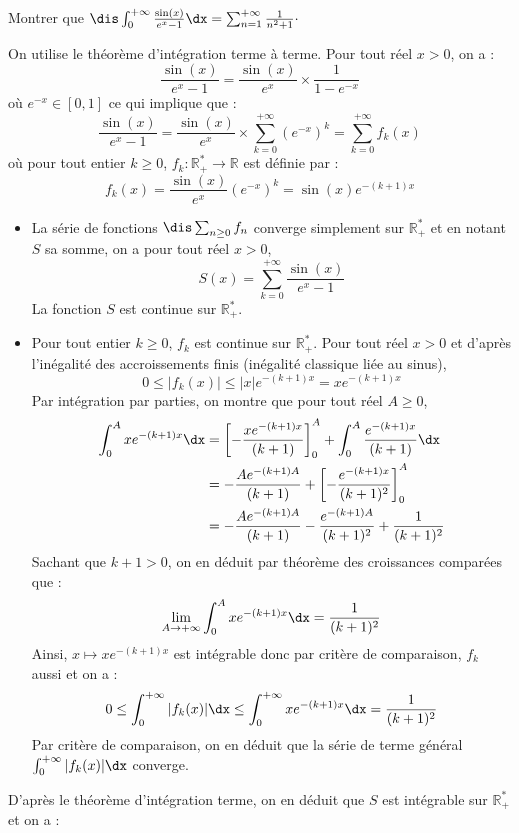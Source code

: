 \documentclass[a4paper,10pt]{report}
\begin{document}
\begin{Exa} Montrer que $\dis \int_{0}^{+ \infty} \frac{\sin(x)}{e^x-1} \dx = \sum_{n=1}^{+ \infty} \frac{1}{n^2+1}\cdot$
\end{Exa}

\corr On utilise le théorème d'intégration terme à terme. Pour tout réel $x>0$, on a :
$$ \frac{\sin(x)}{e^x-1}  = \dfrac{\sin(x)}{e^x} \times \dfrac{1}{1-e^{-x}}$$
où $e^{-x} \in [0,1]$ ce qui implique que :
$$ \frac{\sin(x)}{e^x-1}  = \dfrac{\sin(x)}{e^x} \times \sum_{k=0}^{+ \infty} (e^{-x})^k  = \sum_{k=0}^{+ \infty} f_k(x)$$
où pour tout entier $k \geq 0$, $f_k : \mathbb{R}_+^* \rightarrow \mathbb{R}$ est définie par :
$$ f_k(x) = \dfrac{\sin(x)}{e^x} (e^{-x})^k = \sin(x) e^{-(k+1)x}$$

\begin{itemize}
\item La série de fonctions $\dis \sum_{n \geq 0} f_n$ converge simplement sur $\mathbb{R}_+^*$ et en notant $S$ sa somme, on a pour tout réel $x>0$,
$$ S(x)= \sum_{k=0}^{+ \infty} \dfrac{\sin(x)}{e^x-1}$$
La fonction $S$ est continue sur $\mathbb{R}_+^*$.
\item Pour tout entier $k \geq 0$, $f_k$ est continue sur $\mathbb{R}_+^*$. Pour tout réel $x>0$ et d'après l'inégalité des accroissements finis (inégalité classique liée au sinus),
$$ 0 \leq \vert f_k(x) \vert \leq \vert x \vert e^{-(k+1)x} = x  e^{-(k+1)x}$$
Par intégration par parties, on montre que pour tout réel $A \geq 0$,
\begin{align*}
\int_0^{A} x e^{-(k+1)x} \dx & = \left[- \dfrac{xe^{-(k+1)x}}{(k+1)} \right]_0^A + \int_0^A \dfrac{e^{-(k+1)x}}{(k+1)} \dx \\
& = - \dfrac{Ae^{-(k+1)A}}{(k+1)} +  \left[- \dfrac{e^{-(k+1)x}}{(k+1)^2} \right]_0^A \\
& =  - \dfrac{Ae^{-(k+1)A}}{(k+1)} - \dfrac{e^{-(k+1)A}}{(k+1)^2} + \dfrac{1}{(k+1)^2}
\end{align*}
Sachant que $k+1>0$, on en déduit par théorème des croissances comparées que :
$$ \lim_{A \rightarrow + \infty} \int_0^{A} x e^{-(k+1)x} \dx = \dfrac{1}{(k+1)^2}$$
Ainsi, $x \mapsto x  e^{-(k+1)x}$ est intégrable donc par critère de comparaison, $f_k$ aussi et on a :
$$ 0 \leq \int_0^{+ \infty}\vert f_k(x) \vert \dx \leq  \int_0^{+ \infty} x  e^{-(k+1)x} \dx = \dfrac{1}{(k+1)^2}$$
Par critère de comparaison, on en déduit que la série de terme général $\int_0^{+ \infty}\vert f_k(x) \vert \dx$ converge.
\end{itemize}
D'après le théorème d'intégration terme, on en déduit que $S$ est intégrable sur $\mathbb{R}_+^*$ et on a :
\end{document}
